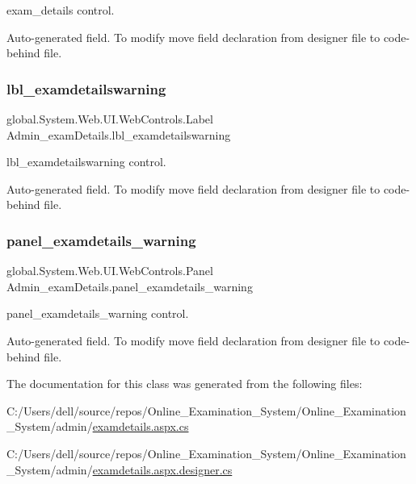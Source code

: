 exam\+\_\+details control. 

Auto-\/generated field. To modify move field declaration from designer file to code-\/behind file. \mbox{\label{class_admin__exam_details_ace4ec1028bc3870e30b3f17ed36ac052}} 
\subsubsection{\texorpdfstring{lbl\_examdetailswarning}{lbl\_examdetailswarning}}
{\footnotesize\ttfamily global.\+System.\+Web.\+U\+I.\+Web\+Controls.\+Label Admin\+\_\+exam\+Details.\+lbl\+\_\+examdetailswarning\hspace{0.3cm}{\ttfamily [protected]}}



lbl\+\_\+examdetailswarning control. 

Auto-\/generated field. To modify move field declaration from designer file to code-\/behind file. \mbox{\label{class_admin__exam_details_a2a02bac9537ad60dd71fabb8c5fb3756}} 
\subsubsection{\texorpdfstring{panel\_examdetails\_warning}{panel\_examdetails\_warning}}
{\footnotesize\ttfamily global.\+System.\+Web.\+U\+I.\+Web\+Controls.\+Panel Admin\+\_\+exam\+Details.\+panel\+\_\+examdetails\+\_\+warning\hspace{0.3cm}{\ttfamily [protected]}}



panel\+\_\+examdetails\+\_\+warning control. 

Auto-\/generated field. To modify move field declaration from designer file to code-\/behind file. 

The documentation for this class was generated from the following files\+:\begin{DoxyCompactItemize}
\item 
C\+:/\+Users/dell/source/repos/\+Online\+\_\+\+Examination\+\_\+\+System/\+Online\+\_\+\+Examination\+\_\+\+System/admin/\mbox{\hyperlink{examdetails_8aspx_8cs}{examdetails.\+aspx.\+cs}}\item 
C\+:/\+Users/dell/source/repos/\+Online\+\_\+\+Examination\+\_\+\+System/\+Online\+\_\+\+Examination\+\_\+\+System/admin/\mbox{\hyperlink{examdetails_8aspx_8designer_8cs}{examdetails.\+aspx.\+designer.\+cs}}\end{DoxyCompactItemize}
